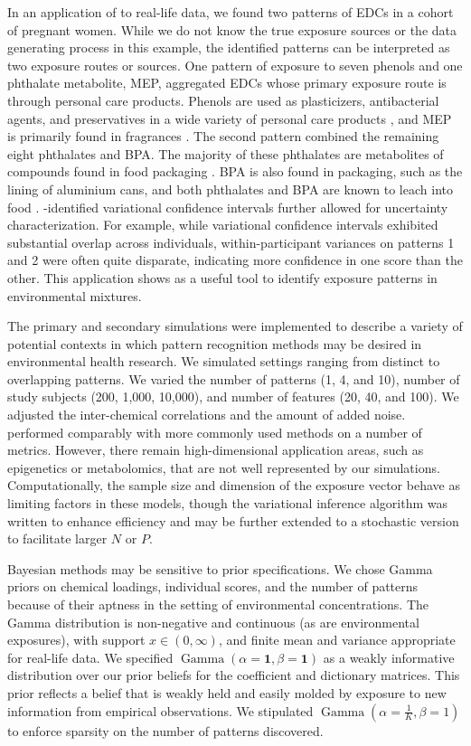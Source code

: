 In an application of \bnmf to real-life data, we found two patterns of EDCs in a cohort of pregnant women. While we do not know the true exposure sources or the data generating process in this example, the identified patterns can be interpreted as two exposure routes or sources. One pattern of exposure to seven phenols and one phthalate metabolite, MEP, aggregated EDCs whose primary exposure route is through personal care products. Phenols are used as plasticizers, antibacterial agents, and preservatives in a wide variety of personal care products \cite{philippat2015exposure}, and MEP is primarily found in fragrances \cite{koniecki2011phthalates}. The second pattern combined the remaining eight phthalates and BPA. The majority of these phthalates are metabolites of compounds found in food packaging \cite{schettler2006human}. BPA is also found in packaging, such as the lining of aluminium cans, and both phthalates and BPA are known to leach into food \cite{vandenberg2007human}. \bnmfc-identified variational confidence intervals further allowed for uncertainty characterization. For example, while variational confidence intervals exhibited substantial overlap across individuals, within-participant variances on patterns 1 and 2 were often quite disparate, indicating more confidence in one score than the other. This application shows \bnmf as a useful tool to identify exposure patterns in environmental mixtures. 

The primary and secondary simulations were implemented to describe a variety of potential contexts in which pattern recognition methods may be desired in environmental health research. We simulated settings ranging from distinct to overlapping patterns. We varied the number of patterns (1, 4, and 10), number of study subjects (200, 1,000, 10,000), and number of features (20, 40, and 100). We adjusted the inter-chemical correlations and the amount of added noise. \bnmf performed comparably with more commonly used methods on a number of metrics. However, there remain high-dimensional application areas, such as epigenetics or metabolomics, that are not well represented by our simulations. Computationally, the sample size and dimension of the exposure vector behave as limiting factors in these models, though the variational inference algorithm was written to enhance efficiency and may be further extended to a stochastic version to facilitate larger $N$ or $P$.

Bayesian methods may be sensitive to prior specifications. We chose Gamma priors on chemical loadings, individual scores, and the number of patterns because of their aptness in the setting of environmental concentrations. The Gamma distribution is non-negative and continuous (as are environmental exposures), with support $x \in (0, \infty)$, and finite mean and variance appropriate for real-life data. We specified $\operatorname{Gamma}(\alpha = \mathbf{1}, \beta = \mathbf{1})$ as a weakly informative distribution over our prior beliefs for the coefficient and dictionary matrices. This prior reflects a belief that is weakly held and easily molded by exposure to new information from empirical observations. We stipulated $\operatorname{Gamma}(\alpha = \frac{1}{K}, \beta = 1)$ to enforce sparsity on the number of patterns discovered.

